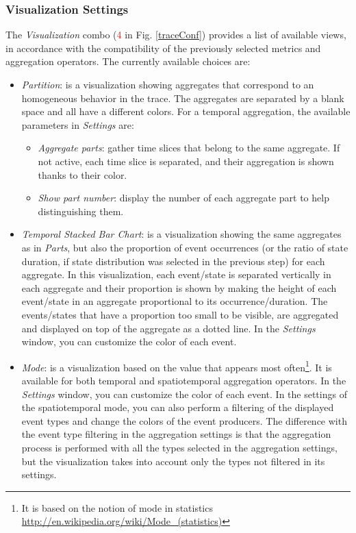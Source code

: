 \documentclass[twoside]{article}
\begin{document}
\begin{sloppypar}
\subsubsection{Visualization Settings}
\label{visuop}
The \textit{Visualization} combo (\textcolor{red}{4} in Fig. \ref{traceConf}) provides a list of available views, in accordance with the compatibility of the previously selected metrics and aggregation operators. The currently available choices are:
\begin{itemize}
	\item \textit{Partition}: is a visualization showing aggregates that correspond to an homogeneous behavior in the trace. The aggregates are separated by a blank space and all have a different colors. For a temporal aggregation, the available parameters in \textit{Settings} are:
	\begin{itemize}
		\item \textit{Aggregate parts}: gather time slices that belong to the same aggregate. If not active, each time slice is separated, and their aggregation is shown thanks to their color.
		\item \textit{Show part number}: display the number of each aggregate part to help distinguishing them.
	\end{itemize}
	\item \textit{Temporal Stacked Bar Chart}: is a visualization showing the same aggregates as in \textit{Parts}, but also the proportion of event occurrences (or the ratio of state duration, if state distribution was selected in the previous step) for each aggregate. In this visualization, each event/state is separated vertically in each aggregate and their proportion is shown by making the height of each event/state in an aggregate proportional to its occurrence/duration. The events/states that have a proportion too small to be visible, are aggregated and displayed on top of the aggregate as a dotted line. In the \textit{Settings} window, you can customize the color of each event.
	\item \textit{Mode}: is a visualization based on the value that appears most often\footnote{It is based on the notion of mode in statistics \url{http://en.wikipedia.org/wiki/Mode_(statistics)}}. It is available for both temporal and spatiotemporal aggregation operators. In the \textit{Settings} window, you can customize the color of each event. In the settings of the spatiotemporal mode, you can also perform a filtering of the displayed event types and change the colors of the event producers. The difference with the event type filtering in the aggregation settings is that the aggregation process is performed with all the types selected in the aggregation settings, but the visualization takes into account only the types not filtered in its settings. 
\end{itemize}


\end{sloppypar}
\end{document}
